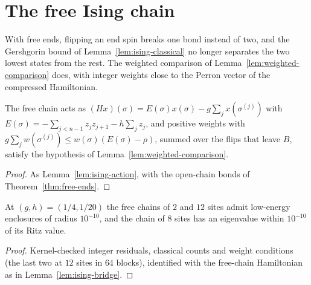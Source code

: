 \section{The free Ising chain}

With free ends, flipping an end spin breaks one bond instead of two, and the Gershgorin bound of
Lemma~\ref{lem:ising-classical} no longer separates the two lowest states from the rest. The
weighted comparison of Lemma~\ref{lem:weighted-comparison} does, with integer weights close to
the Perron vector of the compressed Hamiltonian.

\begin{lemma}
  \label{lem:ising-free-action}
  \leanok
  The free chain acts as \((H x)(\sigma) = E(\sigma) x(\sigma) - g \sum_j x(\sigma^{(j)})\) with
  \(E(\sigma) = -\sum_{j<n-1} z_j z_{j+1} - h \sum_j z_j\), and positive weights with
  \(g \sum_j w(\sigma^{(j)}) \le w(\sigma) (E(\sigma) - \rho)\), summed over the flips that leave
  \(B\), satisfy the hypothesis of Lemma~\ref{lem:weighted-comparison}.
\end{lemma}
\begin{proof}
  \leanok
  As Lemma~\ref{lem:ising-action}, with the open-chain bonds of Theorem~\ref{thm:free-ends}.
\end{proof}

\begin{lemma}
  \label{lem:ising-free-low-spectra}
  \leanok
  At \((g, h) = (1/4, 1/20)\) the free chains of \(2\) and \(12\) sites admit low-energy
  enclosures of radius \(10^{-10}\), and the chain of \(8\) sites has an eigenvalue within
  \(10^{-10}\) of its Ritz value.
\end{lemma}
\begin{proof}
  \leanok
  Kernel-checked integer residuals, classical counts and weight conditions (the last two at
  \(12\) sites in \(64\) blocks), identified with the free-chain Hamiltonian as in
  Lemma~\ref{lem:ising-bridge}.
\end{proof}

